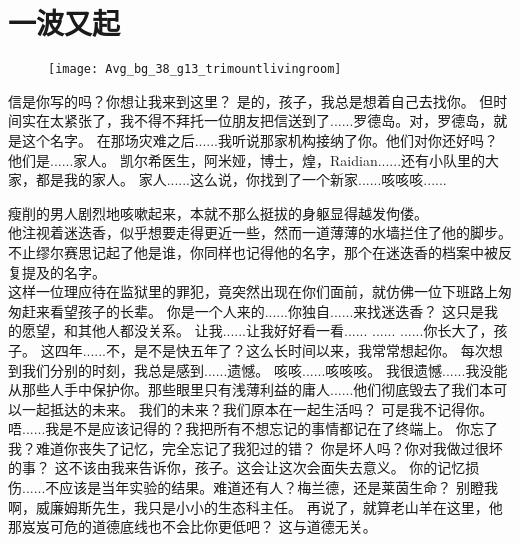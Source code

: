 \documentclass[openany]{book}
\begin{document}
\chapter{一波又起}
\begin{figure}[h]
    \centering
    \texttt{[image: Avg\_bg\_38\_g13\_trimountlivingroom]}
\end{figure}
\begin{dialogue}
     信是你写的吗？你想让我来到这里？
     是的，孩子，我总是想着自己去找你。
     但时间实在太紧张了，我不得不拜托一位朋友把信送到了......罗德岛。对，罗德岛，就是这个名字。
     在那场灾难之后......我听说那家机构接纳了你。他们对你还好吗？
     他们是......家人。
     凯尔希医生，阿米娅，博士，煌，Raidian......还有小队里的大家，都是我的家人。
     家人......这么说，你找到了一个新家......咳咳咳......\par
    瘦削的男人剧烈地咳嗽起来，本就不那么挺拔的身躯显得越发佝偻。\\
    他注视着迷迭香，似乎想要走得更近一些，然而一道薄薄的水墙拦住了他的脚步。\\
    不止缪尔赛思记起了他是谁，你同样也记得他的名字，那个在迷迭香的档案中被反复提及的名字。\\
    这样一位理应待在监狱里的罪犯，竟突然出现在你们面前，就仿佛一位下班路上匆匆赶来看望孩子的长辈。
     你是一个人来的......你独自......来找迷迭香？
     这只是我的愿望，和其他人都没关系。
     让我......让我好好看一看......
     ......
     ......你长大了，孩子。
     这四年......不，是不是快五年了？这么长时间以来，我常常想起你。
     每次想到我们分别的时刻，我总是感到......遗憾。
     咳咳......咳咳咳。
     我很遗憾......我没能从那些人手中保护你。那些眼里只有浅薄利益的庸人......他们彻底毁去了我们本可以一起抵达的未来。
     我们的未来？我们原本在一起生活吗？
     可是我不记得你。
     唔......我是不是应该记得的？我把所有不想忘记的事情都记在了终端上。
     你忘了我？难道你丧失了记忆，完全忘记了我犯过的错？
     你是坏人吗？你对我做过很坏的事？
     这不该由我来告诉你，孩子。这会让这次会面失去意义。
     你的记忆损伤......不应该是当年实验的结果。难道还有人？梅兰德，还是莱茵生命？
     别瞪我啊，威廉姆斯先生，我只是小小的生态科主任。
     再说了，就算老山羊在这里，他那岌岌可危的道德底线也不会比你更低吧？
     这与道德无关。

\end{dialogue}
\end{document}
